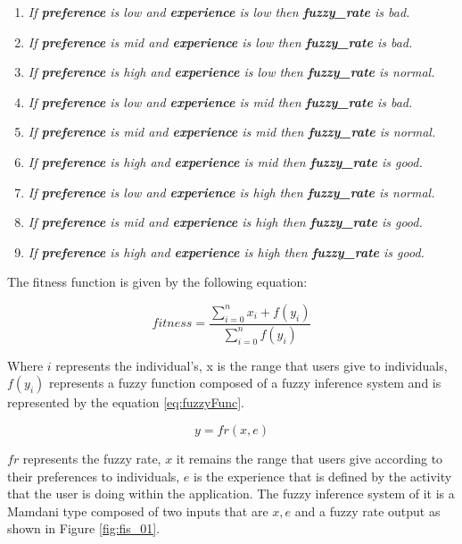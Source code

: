 \begin{enumerate}
	\item \textit{If \textbf{preference} is low and
		\textbf{experience} is low then \textbf{fuzzy\_rate} is bad.}
	\item \textit{If \textbf{preference} is mid and
		\textbf{experience} is low  then \textbf{fuzzy\_rate} is bad.}
	\item \textit{If \textbf{preference} is high and
		\textbf{experience} is low  then \textbf{fuzzy\_rate} is normal.}
	\item \textit{If \textbf{preference} is low and
		\textbf{experience} is mid then \textbf{fuzzy\_rate} is bad.}
	\item \textit{If \textbf{preference} is mid and
		\textbf{experience} is mid  then \textbf{fuzzy\_rate} is normal.}
	\item \textit{If \textbf{preference} is high and
		\textbf{experience} is mid  then \textbf{fuzzy\_rate} is good.}
	\item \textit{If \textbf{preference} is low and
		\textbf{experience} is high then \textbf{fuzzy\_rate} is normal.}
	\item \textit{If \textbf{preference} is mid and
		\textbf{experience} is high  then \textbf{fuzzy\_rate} is good.}
	\item \textit{If \textbf{preference} is high and
		\textbf{experience} is high  then \textbf{fuzzy\_rate} is good.}

\end{enumerate}

The fitness function is given by the following equation:

\begin{equation}\label{eq:fitfunc02}
\displaystyle fitness=\frac{\sum_{i=0}^{n}x_{i}+f(y_{i})}{\sum_{i=0}^{n}f(y_{i})}
\end{equation}

Where $i$ represents the individual's, x is the range that users give to individuals,
$f(y_i)$ represents a fuzzy function composed of a fuzzy inference system and is
represented by the equation \ref{eq:fuzzyFunc}.

\begin{equation}\label{eq:fuzzyFunc}
\displaystyle y=fr(x,e)
\end{equation}


$fr$ represents the fuzzy rate, $x$ it remains the range that users give
according to their preferences to individuals, $e$  is the experience that is
defined by the activity that the user is doing within the application. The fuzzy
inference system of it is a Mamdani type composed of two inputs that are $x,e$
and a fuzzy rate output as shown in Figure \ref{fig:fis_01}.

